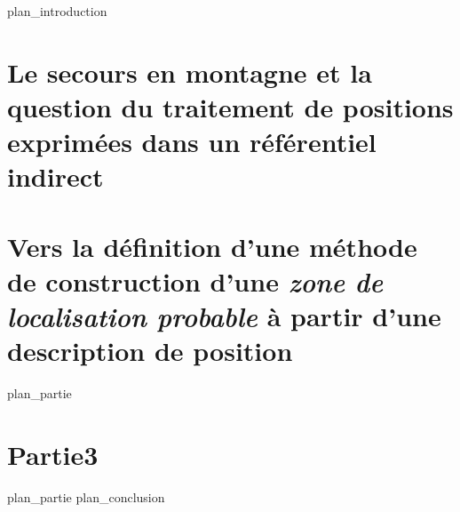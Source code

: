 \label{part:int}
{plan_introduction}
\part{Le secours en montagne et la question du traitement de positions exprimées dans un référentiel indirect}
\label{part:01}
\part{Vers la définition d'une méthode de construction d'une
  \emph{zone de localisation probable} à partir d'une description de
  position}
\label{part:02}
{plan_partie}
\part{Partie3}
\label{part:03}
{plan_partie}
\label{part:cnl}
{plan_conclusion}

